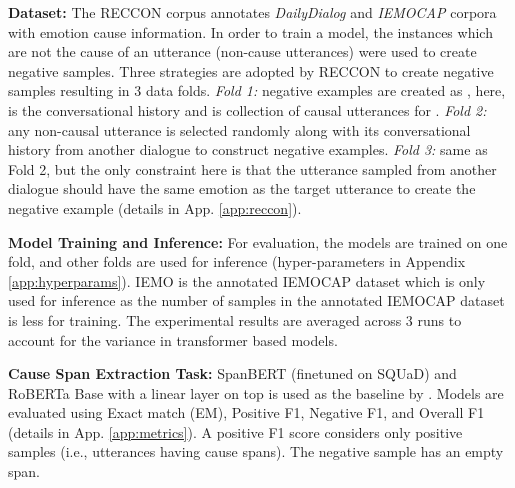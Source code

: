 \documentclass{article}
\begin{document}
\noindent\textbf{Dataset:}
The RECCON corpus annotates \textit{DailyDialog} \cite{li-etal-2017-dailydialog} and \textit{IEMOCAP} \cite{busso2008iemocap} corpora with emotion cause information. In order to train a model, the instances which are not the cause of an utterance (non-cause utterances) were used to create negative samples. Three strategies are adopted by RECCON to create negative samples resulting in 3 data folds. \textit{Fold 1:} negative examples are created as , here,  is the conversational history and  is collection of causal utterances for . \textit{Fold 2:} any non-causal utterance  is selected randomly along with its conversational history  from another dialogue to construct negative examples. \textit{Fold 3:} same as Fold 2, but the only constraint here is that the utterance  sampled from another dialogue should have the same emotion as the target utterance  to create the negative example (details in App. \ref{app:reccon}).

\noindent\textbf{Model Training and Inference:}
For evaluation, the models are trained on one fold, and other folds are used for inference (hyper-parameters in Appendix \ref{app:hyperparams}). IEMO is the annotated IEMOCAP dataset which is only used for inference as the number of samples in the annotated IEMOCAP dataset is less for training. The experimental results are averaged across 3 runs to account for  the variance in transformer based models. 

\noindent\textbf{Cause Span Extraction Task:}
SpanBERT (finetuned on SQUaD) and RoBERTa Base with a linear layer on top is used as the baseline by \citet{poria2020recognizing}. Models are evaluated using Exact match (EM), Positive F1, Negative F1, and Overall F1 (details in App. \ref{app:metrics}). A positive F1 score considers only positive samples (i.e., utterances having cause spans). The negative sample has an empty span. 
\end{document}
